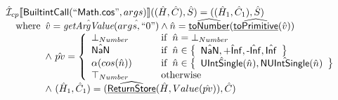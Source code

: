 \[\begin{array}{l}
\aI _{cp}\lbr \SF{BuiltintCall}(``\SF{Math.cos}",args)\rbr((\hat{H},\hat{C}), \hat{S})
  = ((\hat{H}_1, \hat{C}_1), \hat{S})\\
\quad\wherec{
  \hat{v}=\hat{\hf{getArgValue}}(\hat{args, ``0"}) \land \hat{n}=\ahf{toNumber}(\ahf{toPrimitive}(\hat{v}))\\
  \land\ \hat{pv}   = 
  \left\{
    \begin{array}{l@{\quad\quad\quad}l}
      \bot_{Number} & \ifc{\hat{n} = \bot_{Number}}\\
      \hat{\SF{NaN}} & \ifc{\hat{n} \in\set{\hat{\SF{NaN}}, \hat{\SF{+Inf}}, \hat{\SF{-Inf}}, \hat{\SF{Inf}}}}\\
      \alpha(cos(\hat{n})) & \ifc{\hat{n} \in \set{\hat{\SF{UIntSingle}}(\hat{n}), \hat{\SF{NUIntSingle}}(\hat{n})}}\\
      \top_{Number} & \owc\\
    \end{array}
  \right.\\
  \land\ (\hat{H}_1, \hat{C}_1) = (\ahf{ReturnStore}(\hat{H}, Value(\hat{pv})), \hat{C})
  }\\
\\\\


\end{array}
\]
